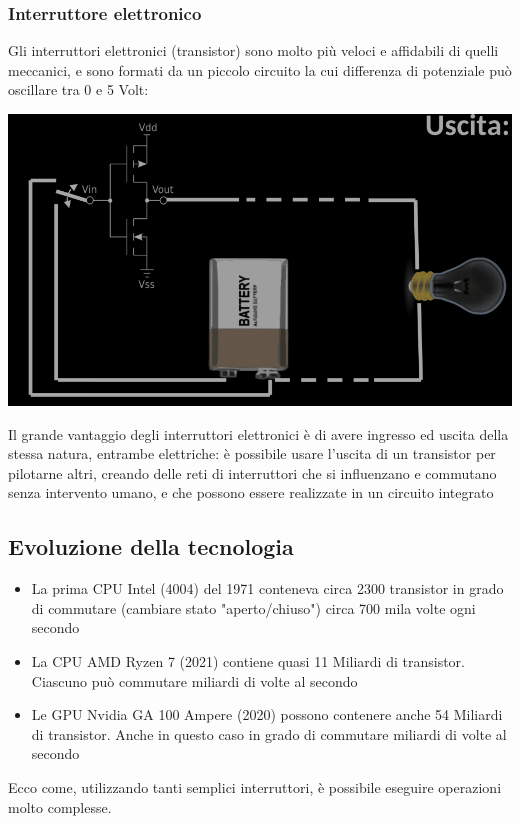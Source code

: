 \documentclass{article}
\begin{document}
\subsubsection{Interruttore elettronico}
Gli interruttori elettronici (transistor) sono molto più veloci e affidabili di quelli meccanici, e sono formati da un piccolo circuito la cui differenza di potenziale può oscillare tra 0 e 5 Volt:
\begin{center}
    \includegraphics[scale=0.35]{intel.png}
\end{center}
Il grande vantaggio degli interruttori elettronici è di avere ingresso ed uscita della stessa natura, entrambe elettriche: è possibile usare l’uscita di un transistor per pilotarne altri, creando delle reti di interruttori che si influenzano e commutano senza intervento umano, e che possono essere realizzate in un circuito integrato
\subsection{Evoluzione della tecnologia}
\begin{itemize}
    \item La prima CPU Intel (4004) del 1971 conteneva circa 2300 transistor in grado di commutare (cambiare stato "aperto/chiuso") circa 700 mila volte ogni secondo
    \item La CPU AMD Ryzen 7 (2021) contiene quasi 11 Miliardi di transistor. Ciascuno può commutare miliardi di volte al secondo
    \item Le GPU Nvidia GA 100 Ampere (2020) possono contenere anche 54 Miliardi di transistor. Anche in questo caso in grado di commutare miliardi di volte al secondo
\end{itemize}
Ecco come, utilizzando tanti semplici interruttori, è possibile eseguire operazioni molto complesse.
\end{document}
